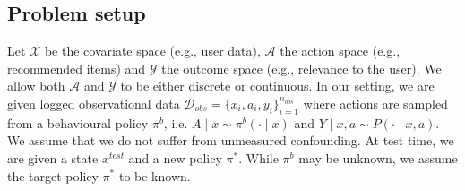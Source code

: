 \subsection{Problem setup}\label{sec:problem_setup}

Let $\mathcal{X}$ be the covariate space (e.g., user  data), $\mathcal{A}$ the action space (e.g., recommended items) and $\mathcal{Y}$ the outcome space (e.g., relevance to the user).
We allow both $\mathcal{A}$ and $\mathcal{Y}$ to be either discrete or continuous.
In our setting, we are given logged observational data $\mathcal{D}_{obs}=\{x_i, a_i, y_i \}_{i=1}^{n_{obs}}$ where actions are sampled from a behavioural policy $\pi^{b}$, i.e. $A \mid x \sim \pi^{b}(\cdot\mid x)$ and $Y \mid x,a \sim P(\cdot \mid x, a)$. We assume that we do not suffer from unmeasured confounding. At test time, we are given a state $x^{test}$ and a new policy $\pi^*$. While $\pi^{b}$ may be unknown, we assume the target policy $\pi^*$ to be known.
